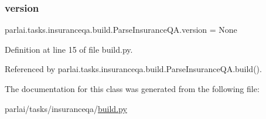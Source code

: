 \mbox{\label{classparlai_1_1tasks_1_1insuranceqa_1_1build_1_1ParseInsuranceQA_a0d836d18b0fe51bb6920e5cc743b500d}} 
\subsubsection{\texorpdfstring{version}{version}}
{\footnotesize\ttfamily parlai.\+tasks.\+insuranceqa.\+build.\+Parse\+Insurance\+Q\+A.\+version = None\hspace{0.3cm}{\ttfamily [static]}}



Definition at line 15 of file build.\+py.



Referenced by parlai.\+tasks.\+insuranceqa.\+build.\+Parse\+Insurance\+Q\+A.\+build().



The documentation for this class was generated from the following file\+:\begin{DoxyCompactItemize}
\item 
parlai/tasks/insuranceqa/\hyperlink{parlai_2tasks_2insuranceqa_2build_8py}{build.\+py}\end{DoxyCompactItemize}
